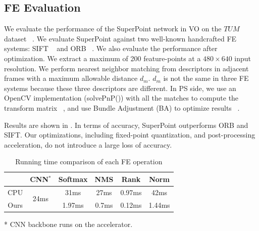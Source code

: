 

\subsection{ FE Evaluation }

We evaluate the performance of the SuperPoint network in VO on the $TUM$ dataset ~\cite{sturm12iros}. We evaluate SuperPoint against two well-known handcrafted FE systems: SIFT ~\cite{Lowe-478} and ORB ~\cite{Mur-Artal:2017281}. 
We also evaluate the performance after optimization. 
We extract a maximum of 200 feature-points at a $480\times640$ input resolution. 
We perform nearest neighbor matching from descriptors in adjacent frames with a maximum allowable distance $d_m$. $d_m$ is not the same in three FE systems because these three descriptors are different. In PS side, we use an OpenCV implementation (solvePnP()) with all the matches to compute the transform matrix  ~\cite{LepetitMoreno-Noguer-EPnP}, and use Bundle Adjustment (BA) to optimize results  ~\cite{TriggsMclauchlan-Bundle-Adjustment}. 

Results are shown in . In terms of accuracy, SuperPoint outperforms ORB and SIFT. Our optimizations, including fixed-point quantization, and post-processing acceleration, do not introduce a large loss of accuracy. 

\begin{table}[t]
  \centering
  \caption{Running time comparison of each FE operation}
    \begin{threeparttable}
\begin{tabular}{|c|c|c|c|c|c|}
  \hline
             &CNN$^*$ &    Softmax &        NMS &       Rank &  Norm \\
  \hline
         CPU & \multirow{2}{*}{24ms} &      31ms &       27ms &       0.97ms &       42ms \\
  \cline{1-1} \cline{3-6}
    Ours & \multirow{2}{*}{} &    1.97ms &      0.7ms &     0.12ms &     1.44ms \\
  \hline
  \end{tabular} 
  \small
\begin{tablenotes}
   \item[*] CNN backbone runs on the accelerator.  
\end{tablenotes}
    \end{threeparttable}
  
  \label{tab:optimization}%
\end{table}%

